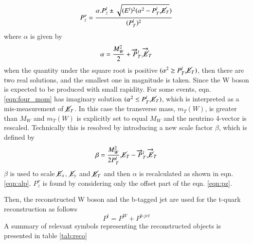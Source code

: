 \begin{equation}
\label{eqn:pz}
    P^{\nu}_{z} = \frac{\alpha.P^{l}_{z} \pm \sqrt{(E^{l})^{2}( \alpha^{2} - P_{T}^{l}.\cancel{E}_{T}})}{(P^{l}_{T})^{2}}
\end{equation}
where $\alpha$ is given by 
\begin{equation}
\label{eqn:alp}
    \alpha = \frac{M_{W}^{2}}{2} + \overrightarrow{P}^{l}_{T}.\overrightarrow{\cancel{E}}_{T}
\end{equation}
when the quantity under the square root is positive $( \alpha^{2} \geq P_{T}^{l}.\cancel{E}_{T})$, then there are two real solutions, and the smallest one in magnitude is taken. Since the W boson is expected to be produced with small rapidity. For some events, eqn. \ref{eqn:four_mom} has imaginary solution $( \alpha^{2} \leq P_{T}^{l}.\cancel{E}_{T})$, which is interpreted as a mis-measurement of $\cancel{E}_{T}$. In this case the transverse mass, $m_{T}(W)$, is greater than $M_{W}$ and $m_{T}(W)$ is explicitly set to equal $M_{W}$ and the neutrino 4-vector is rescaled. Technically this is resolved by introducing a new scale factor $\beta$, which is defined by 
\begin{equation}
\label{eqn:beta}
    \beta = \frac{M_{W}^{2}}{2P^{l}_{T}}.\cancel{E}_{T} - \overrightarrow{P}^{l}_{T}.\overrightarrow{\cancel{E}}_{T}
\end{equation}
$\beta$ is used to scale $\cancel{E}_{x}$, $\cancel{E}_{y}$ and $\cancel{E}_{T}$ and then $\alpha$ is recalculated as shown in eqn. \ref{eqn:alp}. $P^{\nu}_{z}$ is found by considering only the offset part of the eqn. \ref{eqn:pz}.

Then, the reconstructed W boson and the b-tagged jet are used for the t-quark reconstruction as follows
\begin{equation}
\label{eqn:top}
    P^{t} = P^{W} + P^{b\text{-}jet}
\end{equation}
A summary of relevant symbols representing the reconstructed objects is presented in table \ref{tab:reco}

